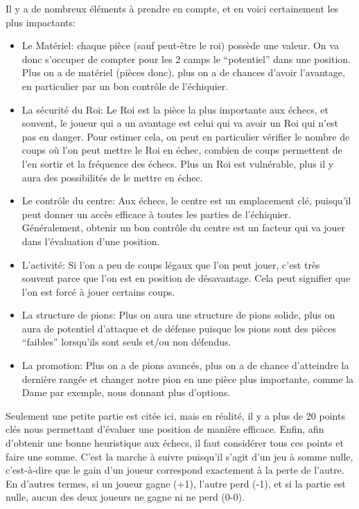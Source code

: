 \documentclass{article}
\begin{document}
Il y a de nombreux éléments à prendre en compte, et en voici certainement les plus impactants:
\begin{itemize}
    \item Le Matériel: chaque pièce (sauf peut-être le roi) possède une valeur. On va donc s'occuper de compter pour les 2 camps le ``potentiel''
    dans une position. Plus on a de matériel (pièces donc), plus on a de chances d'avoir l'avantage, en particulier par un bon contrôle de l'échiquier.
    \item La sécurité du Roi: Le Roi est la pièce la plus importante aux échecs, et souvent, le joueur qui a un avantage est celui qui va
    avoir un Roi qui n'est pas en danger. Pour estimer cela, on peut en particulier vérifier le nombre de coups où l'on peut mettre le Roi en échec,
    combien de coups permettent de l'en sortir et la fréquence des échecs. Plus un Roi est vulnérable, plus il y aura des possibilités
    de le mettre en échec.
    \item Le contrôle du centre: Aux échecs, le centre est un emplacement clé, puisqu'il peut donner un accès efficace à toutes les parties de
    l'échiquier. Généralement, obtenir un bon contrôle du centre est un facteur qui va jouer dans l'évaluation d'une position.
    \item L'activité: Si l'on a peu de coups légaux que l'on peut jouer, c'est très souvent parce que l'on est en position de désavantage. Cela peut
    signifier que l'on est forcé à jouer certains coups.
    \item La structure de pions: Plus on aura une structure de pions solide, plus on aura de potentiel d'attaque et de défense puisque les pions sont
    des pièces ``faibles'' lorsqu'ils sont seuls et/ou non défendus.
    \item La promotion: Plus on a de pions avancés, plus on a de chance d'atteindre la dernière rangée et changer notre pion en une pièce plus importante,
    comme la Dame par exemple, nous donnant plus d'options.
\end{itemize}

Seulement une petite partie est citée ici, mais en réalité, il y a plus de 20 points clés nous permettant d'évaluer une position de manière efficace.
Enfin, afin d'obtenir une bonne heuristique aux échecs, il faut considérer tous ces points et faire une somme. C'est la marche à suivre puisqu'il 
s'agit d'un jeu à somme nulle, c'est-à-dire que le gain d'un joueur correspond exactement à la perte de l'autre. En d'autres termes, si un joueur gagne 
(+1), l'autre perd (-1), et si la partie est nulle, aucun des deux joueurs ne gagne ni ne perd (0-0).
\end{document}
